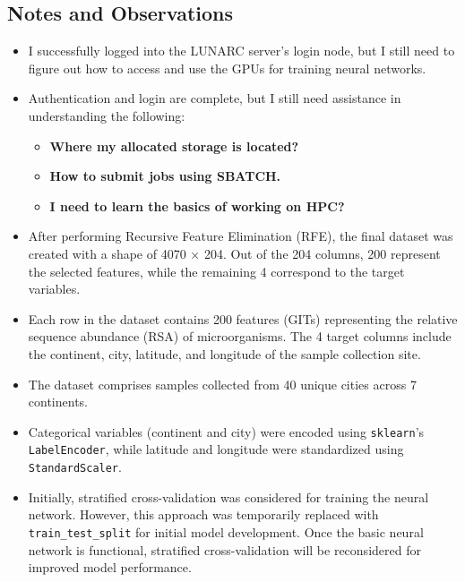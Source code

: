 \documentclass{article}
\begin{document}
\subsection*{Notes and Observations}
\begin{itemize}
    \item I successfully logged into the LUNARC server’s login node, but I still need to figure out how to access and use the GPUs for training neural networks.
    \item Authentication and login are complete, but I still need assistance in understanding the following:
    \begin{itemize}
        \item \textbf{Where my allocated storage is located?}
        \item \textbf{How to submit jobs using SBATCH.}
        \item \textbf{I need to learn the basics of working on HPC?}
    \end{itemize}
    \item After performing Recursive Feature Elimination (RFE), the final dataset was created with a shape of 4070 × 204. Out of the 204 columns, 200 represent the selected features, while the remaining 4 correspond to the target variables.
    \item Each row in the dataset contains 200 features (GITs) representing the relative sequence abundance (RSA) of microorganisms. The 4 target columns include the continent, city, latitude, and longitude of the sample collection site.
    \item The dataset comprises samples collected from 40 unique cities across 7 continents.
    \item Categorical variables (continent and city) were encoded using \texttt{sklearn}'s \texttt{LabelEncoder}, while latitude and longitude were standardized using \texttt{StandardScaler}.
    \item Initially, stratified cross-validation was considered for training the neural network. However, this approach was temporarily replaced with \texttt{train\_test\_split} for initial model development. Once the basic neural network is functional, stratified cross-validation will be reconsidered for improved model performance.
\end{itemize}
\end{document}
